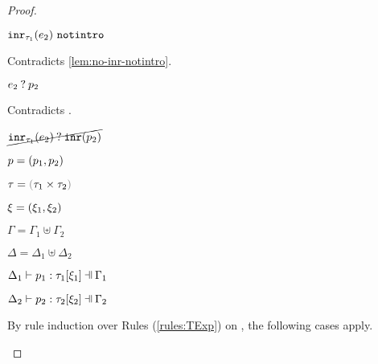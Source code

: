 \begin{proof}
\begin{byCases}
\begin{byCases}
\begin{byCases}
            \begin{byCases}
            \item[\text{(\ref{rule:MMNotIntro})}]
                \begin{pfsteps*}
                \item $\mathtt{inr}_{\tau_1}({e_2}) ~\mathtt{notintro}$ 
                \end{pfsteps*}
                Contradicts \autoref{lem:no-inr-notintro}.
            \item[\text{(\ref{rule:MMInr})}]
                \begin{pfsteps*}
                \item $e_2 \mathbin{?} p_2$ 
                \end{pfsteps*}
                Contradicts .
            \end{byCases}
            \begin{pfsteps*}
            \item $\cancel{\mathtt{inr}_{\tau_1}({e_2}) \mathbin{?} \mathtt{inr}(p_2)}$ 
            \end{pfsteps*}
        \end{byCases}
    \end{byCases}
\item[\text{(\ref{rule:PTPair})}]
    \begin{pfsteps*}
    \item $p=(p_1 , p_2)$ 
    \item $\tau=\tprod{\tau_1}{\tau_2}$ 
    \item $\xi=(\xi_1 , \xi_2)$ 
    \item $\Gamma=\Gamma_1 \uplus \Gamma_2$ 
    \item $\Delta=\Delta_1 \uplus \Delta_2$ 
    \item $\chpattyp{p_1}{\tau_1}{\xi_1}{\Gamma_1}{\Delta_1}$  
    \item $\chpattyp{p_2}{\tau_2}{\xi_2}{\Gamma_2}{\Delta_2}$  
    \end{pfsteps*}
    By rule induction over Rules (\ref{rules:TExp}) on , the following cases apply.
    \begin{byCases}
    \item[\text{(\ref{rule:TEHole}),(\ref{rule:THole}),(\ref{rule:TAp}),(\ref{rule:TFst}),(\ref{rule:TSnd}),(\ref{rule:TMatchZPre}),(\ref{rule:TMatchNZPre})}]

\end{byCases}
\end{byCases}
\end{proof}
